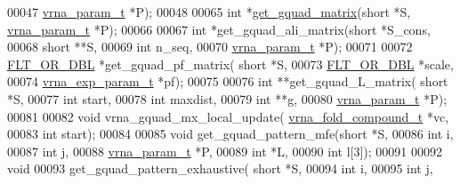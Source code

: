 \begin{DoxyCode}
00047                             \hyperlink{group__energy__parameters_structvrna__param__s}{vrna\_param\_t} *P);
00048 
00065 \textcolor{keywordtype}{int}         *\hyperlink{group__loops_ga392e45c9615aa123737671603fa4203c}{get\_gquad\_matrix}(\textcolor{keywordtype}{short} *S, \hyperlink{group__energy__parameters_structvrna__param__s}{vrna\_param\_t} *P);
00066 
00067 \textcolor{keywordtype}{int}         *get\_gquad\_ali\_matrix(\textcolor{keywordtype}{short} *S\_cons,
00068                                   \textcolor{keywordtype}{short} **S,
00069                                   \textcolor{keywordtype}{int} n\_seq,
00070                                   \hyperlink{group__energy__parameters_structvrna__param__s}{vrna\_param\_t} *P);
00071 
00072 \hyperlink{group__data__structures_ga31125aeace516926bf7f251f759b6126}{FLT\_OR\_DBL}  *get\_gquad\_pf\_matrix( \textcolor{keywordtype}{short} *S,
00073                                   \hyperlink{group__data__structures_ga31125aeace516926bf7f251f759b6126}{FLT\_OR\_DBL} *scale,
00074                                   \hyperlink{group__energy__parameters_structvrna__exp__param__s}{vrna\_exp\_param\_t} *pf);
00075 
00076 \textcolor{keywordtype}{int}         **get\_gquad\_L\_matrix( \textcolor{keywordtype}{short} *S,
00077                                   \textcolor{keywordtype}{int} start,
00078                                   \textcolor{keywordtype}{int} maxdist,
00079                                   \textcolor{keywordtype}{int} **g,
00080                                   \hyperlink{group__energy__parameters_structvrna__param__s}{vrna\_param\_t} *P);
00081 
00082 \textcolor{keywordtype}{void}        vrna\_gquad\_mx\_local\_update( \hyperlink{group__fold__compound_structvrna__fc__s}{vrna\_fold\_compound\_t} *vc,
00083                                         \textcolor{keywordtype}{int} start);
00084 
00085 \textcolor{keywordtype}{void}        get\_gquad\_pattern\_mfe(\textcolor{keywordtype}{short} *S,
00086                                   \textcolor{keywordtype}{int} i,
00087                                   \textcolor{keywordtype}{int} j,
00088                                   \hyperlink{group__energy__parameters_structvrna__param__s}{vrna\_param\_t} *P,
00089                                   \textcolor{keywordtype}{int} *L,
00090                                   \textcolor{keywordtype}{int} l[3]);
00091 
00092 \textcolor{keywordtype}{void}
00093 get\_gquad\_pattern\_exhaustive( \textcolor{keywordtype}{short} *S,
00094                               \textcolor{keywordtype}{int} i,
00095                               \textcolor{keywordtype}{int} j,

\end{DoxyCode}
